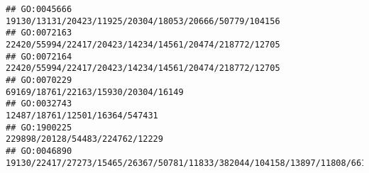 \documentclass[
]{article}
\begin{document}
\begin{verbatim}
## GO:0045666                                                                                                                                                                                                                                                                                                                                                       19130/13131/20423/11925/20304/18053/20666/50779/104156
## GO:0072163                                                                                                                                                                                                                                                                                                                                                       22420/55994/22417/20423/14234/14561/20474/218772/12705
## GO:0072164                                                                                                                                                                                                                                                                                                                                                       22420/55994/22417/20423/14234/14561/20474/218772/12705
## GO:0070229                                                                                                                                                                                                                                                                                                                                                                          69169/18761/22163/15930/20304/16149
## GO:0032743                                                                                                                                                                                                                                                                                                                                                                               12487/18761/12501/16364/547431
## GO:1900225                                                                                                                                                                                                                                                                                                                                                                              229898/20128/54483/224762/12229
## GO:0046890                                                                                                                                                                                                                                                                                                                       19130/22417/27273/15465/26367/50781/11833/382044/104158/13897/11808/66113/103142/16149

\end{verbatim}
\end{document}
